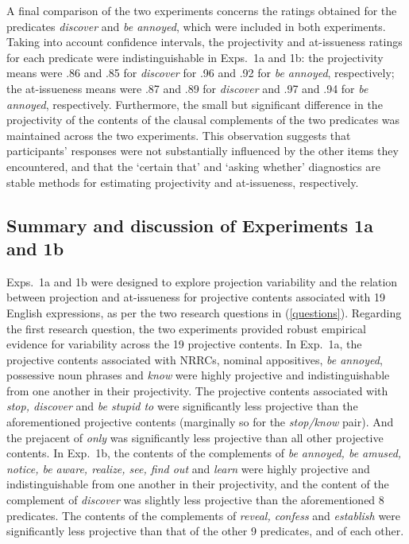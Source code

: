 \documentclass[11pt,fleqn]{article}
\newcommand{\6}{\mbox{$[\hspace*{-.6mm}[$}}
\newcommand{\9}{\mbox{$]\hspace*{-.6mm}]$}}
\begin{document}
A final comparison of the two experiments concerns the ratings obtained for the predicates {\em discover} and {\em be annoyed}, which were included in both experiments. Taking into account confidence intervals, the projectivity and at-issueness ratings for each predicate were indistinguishable in Exps.~1a and 1b: the projectivity means were .86 and .85 for {\em discover} for .96 and .92 for \emph{be annoyed}, respectively; the at-issueness means were .87 and .89 for \emph{discover} and .97 and .94 for \emph{be annoyed}, respectively. Furthermore, the small but significant difference in the projectivity of the contents of the clausal complements of the two predicates was maintained across the two experiments. This observation suggests that participants' responses were not substantially influenced by the other items they encountered, and that the `certain that' and `asking whether' diagnostics are stable methods for estimating projectivity and at-issueness, respectively.

\subsection{Summary and discussion of Experiments 1a and 1b}\label{s-summary1a1b}

Exps.~1a and 1b were designed to explore projection variability and the relation between projection and at-issueness for projective contents associated with 19 English expressions, as per the two research questions in (\ref{questions}). Regarding the first research question, the two experiments provided robust empirical evidence for variability across the 19 projective contents. In Exp.~1a, the projective contents associated with NRRCs, nominal appositives, {\em be annoyed}, possessive noun phrases and {\em know} were highly projective and indistinguishable from one another in their projectivity. The projective contents associated with {\em stop, discover} and {\em be stupid to} were significantly less projective than the aforementioned projective contents (marginally so for the {\em stop/know} pair). And the prejacent of {\em only} was significantly less projective than all other projective contents. In Exp.~1b, the contents of the complements of {\em be annoyed, be amused, notice, be aware, realize, see, find out} and {\em learn} were highly projective and indistinguishable from one another in their projectivity, and the content of the complement of {\em discover} was slightly less projective than the aforementioned 8 predicates. The contents of the complements of {\em reveal, confess} and {\em establish} were significantly less projective than that of the other 9 predicates, and of each other. 
\end{document}
